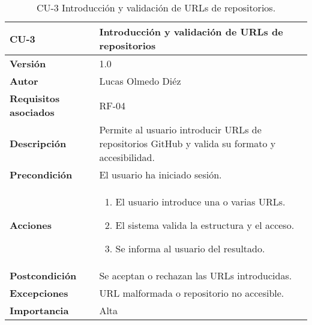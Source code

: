 \clearpage
\begin{table}[p]
    \centering
    \begin{tabularx}{\linewidth}{ p{} p{} }
        \toprule
        \textbf{CU-3}    & Introducción y validación de URLs de repositorios \\
        \midrule
        \textbf{Versión}              & 1.0 \\
        \textbf{Autor}                & Lucas Olmedo Diéz \\
        \textbf{Requisitos asociados} & RF-04 \\
        \textbf{Descripción}          & Permite al usuario introducir URLs de repositorios GitHub y valida su formato y accesibilidad. \\
        \textbf{Precondición}         & El usuario ha iniciado sesión. \\
        \textbf{Acciones}             &
        \begin{enumerate}
            \def\labelenumi{\arabic{enumi}.}
            \tightlist
            \item El usuario introduce una o varias URLs.
            \item El sistema valida la estructura y el acceso.
            \item Se informa al usuario del resultado.
        \end{enumerate}\\
        \textbf{Postcondición}        & Se aceptan o rechazan las URLs introducidas. \\
        \textbf{Excepciones}          & URL malformada o repositorio no accesible. \\
        \textbf{Importancia}          & Alta \\
        \bottomrule
    \end{tabularx}
    \caption{CU-3 Introducción y validación de URLs de repositorios.}
\end{table}

